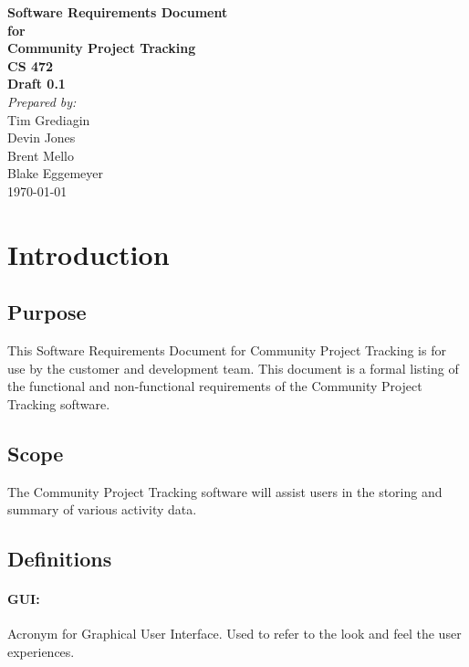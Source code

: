 \documentclass[12pt]{article}
\begin{document}
\begin{titlepage}
\begin{flushright} 
{\LARGE \bfseries Software Requirements Document}\\[1.2cm]
{\large \bfseries for}\\[1.2cm]
{\huge \bfseries Community Project Tracking}\\[1.2cm]
{\large \bfseries CS 472}\\
\vfill
{\large \bfseries Draft 0.1}\\[2cm]
\emph{Prepared by:} \\
Tim Grediagin\\
Devin Jones\\
Brent Mello\\
Blake Eggemeyer \\ [3cm]
{\large \today}
\\[2cm]
\end{flushright}
\end{titlepage}
\setcounter{tocdepth}{3}
\setcounter{secnumdepth}{4}
\tableofcontents
\newpage
\section{Introduction}

\subsection{Purpose}
This Software Requirements Document for Community Project Tracking is for use by the customer and development team. This document is a formal listing of the functional and non-functional requirements of the Community Project Tracking software.

\subsection{Scope}
The Community Project Tracking software will assist users in the storing and summary of various activity data.

\subsection{Definitions}
\setcounter{paragraph}{0}
\setcounter{subsubsection}{0}
\paragraph{GUI:} Acronym for Graphical User Interface. Used to refer to the look and feel the user experiences.
\end{document}
